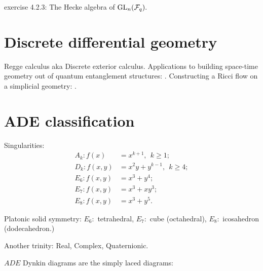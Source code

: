 \documentclass[12pt]{article}
\begin{document}
\cite{Kassel2010}
exercise 4.2.3: The Hecke algebra of $\mathrm{GL}_n(\mathcal{F}_q).$

%
%

%
%

\section{Discrete differential geometry}

Regge calculus aka Discrete exterior calculus.
Applications to building space-time geometry out of
quantum entanglement structures: \cite{Cao2016}.
Constructing a Ricci flow on a simplicial geometry: \cite{Miller2014}.


%
%

\section{ADE classification}

Singularities:
\begin{align*}
A_k:f(x)   &= x^{k+1}, \ \ k\ge 1;\\
D_k:f(x,y) &= x^2y + y^{k-1},\ \  k\ge 4;\\
E_6:f(x,y) &= x^3 + y^4;\\
E_7:f(x,y) &= x^3 + xy^3;\\
E_8:f(x,y) &= x^3 + y^5.
\end{align*}

Platonic solid symmetry:
$E_6:$ tetrahedral, $E_7:$ cube (octahedral), $E_8:$ icosahedron (dodecahedron.)

Another trinity: Real, Complex, Quaternionic.

$ADE$ Dynkin diagrams are the simply laced diagrams: 

\begin{center}
\end{center}
\end{document}
